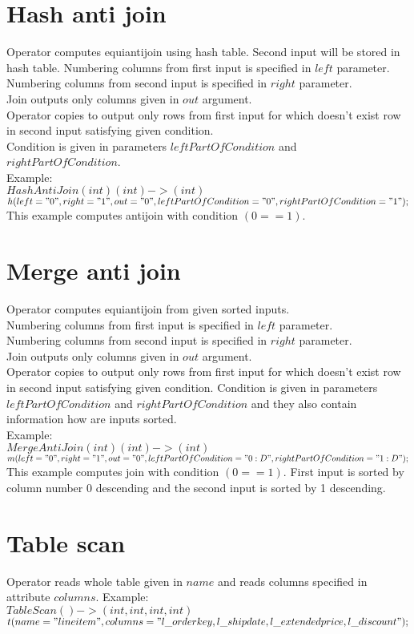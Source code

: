 \documentclass{article}
\begin{document}
\section{Hash anti join}
Operator computes equiantijoin using hash table. Second input will be stored in hash table.
Numbering columns from first input is specified in $left$ parameter.\\
Numbering columns from second input is specified in $right$ parameter.\\
Join outputs only columns given in $out$ argument.\\
Operator copies to output only rows from first input for which doesn't exist row in second input satisfying given condition.\\
Condition is given in parameters $leftPartOfCondition$ and $rightPartOfCondition$.\\
Example:\\
$HashAntiJoin(int)(int)->(int)$\\
$h(left="0",right="1",out="0",leftPartOfCondition="0",rightPartOfCondition="1");$\\ 
This example computes antijoin with condition $(0==1)$.

\section{Merge anti join}
Operator computes equiantijoin from given sorted inputs.\\
Numbering columns from first input is specified in $left$ parameter.\\
Numbering columns from second input is specified in $right$ parameter.\\
Join outputs only columns given in $out$ argument.\\
Operator copies to output only rows from first input for which doesn't exist row in second input satisfying given condition.
Condition is given in parameters $leftPartOfCondition$ and $rightPartOfCondition$ and they also contain information how are inputs sorted.\\
Example:\\
$MergeAntiJoin(int)(int)->(int)$\\
$m(left="0",right="1",out="0",leftPartOfCondition="0:D",rightPartOfCondition="1:D");$\\ 
This example computes join with condition $(0==1)$. First input is sorted by column number 0 descending and the second input is sorted by 1 descending.

\section{Table scan}
Operator reads whole table given in $name$ and reads columns specified in attribute $columns$.
Example:\\
$TableScan()->(int,int,int,int)$\\
$t(name="lineitem",columns="l\_orderkey,l\_shipdate,l\_extendedprice,l\_discount");$\\ 
\end{document}
